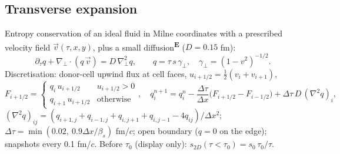 \documentclass[11pt,a4paper]{article}
\newcommand{\emp}{\textsuperscript{\color{orange!80!black}\textbf{E}}}
\begin{document}
\subsection{Transverse expansion}
Entropy conservation of an ideal fluid in Milne coordinates with a prescribed velocity field $\vec v(\tau,x,y)$, plus a
small diffusion\emp{} ($D = 0.15$ fm):
\begin{equation}
\partial_\tau q + \nabla_\perp\!\cdot(q\,\vec v) = D\,\nabla_\perp^2 q,\qquad q = \tau\,s\,\gamma_\perp,\quad
\gamma_\perp = (1-v^2)^{-1/2}.
\end{equation}
Discretisation: donor-cell upwind flux at cell faces, $u_{i+1/2} = \tfrac12(v_i+v_{i+1})$,
\begin{equation}
F_{i+1/2} = \begin{cases} q_i\,u_{i+1/2} & u_{i+1/2}>0\\ q_{i+1}\,u_{i+1/2} & \text{otherwise}\end{cases},\quad
q_i^{n+1} = q_i^n - \frac{\Delta\tau}{\Delta x}\big(F_{i+1/2}-F_{i-1/2}\big) + \Delta\tau\,D\,(\nabla^2 q)_i,
\end{equation}
$(\nabla^2 q)_{ij} = (q_{i+1,j}+q_{i-1,j}+q_{i,j+1}+q_{i,j-1}-4q_{ij})/\Delta x^2$;
$\Delta\tau = \min(0.02,\ 0.9\Delta x/\beta_s)$ fm/$c$; open boundary ($q=0$ on the edge); snapshots every 0.1 fm/$c$.
Before $\tau_0$ (display only): $s_{2D}(\tau<\tau_0) = s_0\,\tau_0/\tau$.
\end{document}
